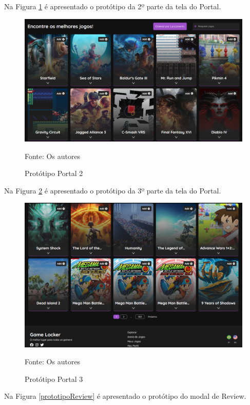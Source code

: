 \begin{apendicesenv}
Na Figura \ref{prototipoPortal2} é apresentado o protótipo da 2º parte da tela do Portal.

\begin{figure}[H]
	\centering
	\includegraphics[width=1\textwidth,keepaspectratio]{./imagens/PrototipoPortal2.png}
	\caption{Protótipo Portal 2}
	Fonte: Os autores
 \label{prototipoPortal2}
\end{figure}
\pagebreak

Na Figura \ref{prototipoPortal3} é apresentado o protótipo da 3º parte da tela do Portal.

\begin{figure}[H]
	\centering
	\includegraphics[width=1\textwidth,keepaspectratio]{./imagens/PrototipoPortal3.png}
	\caption{Protótipo Portal 3}
	Fonte: Os autores
 \label{prototipoPortal3}
\end{figure}
\pagebreak

Na Figura \ref{prototipoReview} é apresentado o protótipo do modal de Review.


\end{apendicesenv}
